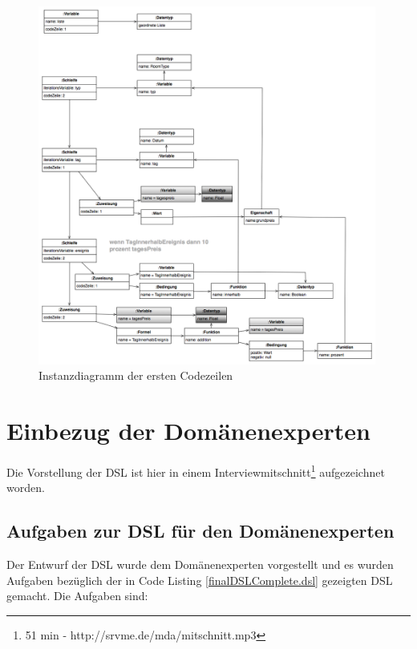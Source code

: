 \documentclass[11pt,english,ngerman, headsepline]{scrreprt}
\begin{document}
\begin{figure}[h!]
	\begin{center}
	\includegraphics[width=0.99\textwidth]{pics/mmInstanz}
	\end{center}
	\caption{Instanzdiagramm der ersten Codezeilen}
	\label{mmInstanz.png}
\end{figure}
 \clearpage
 
\chapter{Einbezug der Domänenexperten}

Die Vorstellung der DSL ist hier in einem Interviewmitschnitt\footnote{51 min -
http://srvme.de/mda/mitschnitt.mp3} aufgezeichnet worden.


\section{Aufgaben zur DSL für den Domänenexperten}

Der Entwurf der DSL wurde dem Domänenexperten vorgestellt und es wurden
Aufgaben bezüglich der in Code Listing \ref{finalDSLComplete.dsl} gezeigten DSL gemacht.
Die Aufgaben sind:
\end{document}
